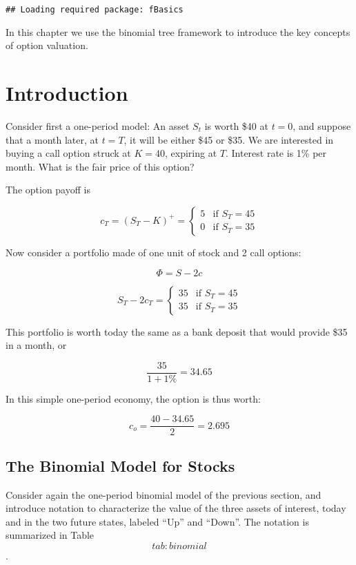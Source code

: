 \documentclass[justified]{tufte-book}
\begin{document}
\begin{verbatim}
## Loading required package: fBasics
\end{verbatim}

In this chapter we use the binomial tree framework to introduce the key
concepts of option valuation.

\hypertarget{introduction}{%
\section{Introduction}\label{introduction}}

Consider first a one-period model: An asset \(S_t\) is worth \$40 at
\(t=0\), and suppose that a month later, at \(t=T\), it will be either \$45
or \$35. We are interested in buying a call option struck at \(K=40\),
expiring at \(T\). Interest rate is 1\% per month. What is the fair price
of this option?

The option payoff is

\[c_T = (S_T-K)^+ =
    \begin{cases}
        5 & \text{if $S_T=45$}\\
        0 & \text{if $S_T=35$}
    \end{cases}\]

Now consider a portfolio made of one unit of stock and 2 call options:

\[\Phi = S - 2c\]

\[S_T - 2 c_T =
    \begin{cases}
        35 & \text{if $S_T=45$}\\
        35 & \text{if $S_T=35$}
    \end{cases}\]

This portfolio is worth today the same as a bank deposit that would
provide \$35 in a month, or

\[\frac{35}{1 + 1\%} = 34.65\]

In this simple one-period economy, the option is thus worth:

\[c_o = \frac{40-34.65}{2} = 2.695\]

\hypertarget{subsec:binomial}{%
\subsection{The Binomial Model for Stocks}\label{subsec:binomial}}

Consider again the one-period binomial model of the previous section,
and introduce notation to characterize the value of the three assets of
interest, today and in the two future states, labeled ``Up'' and ``Down''.
The notation is summarized in Table~\[tab:binomial\].
\end{document}
